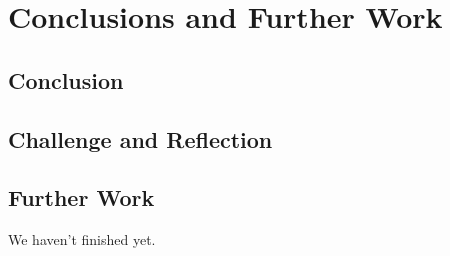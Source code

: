 \documentclass[../main.tex]{subfiles}
\begin{document}
\chapter{Conclusions and Further Work}
\section{Conclusion}
\section{Challenge and Reflection}
\section{Further Work}
We haven't finished yet.
\end{document}
